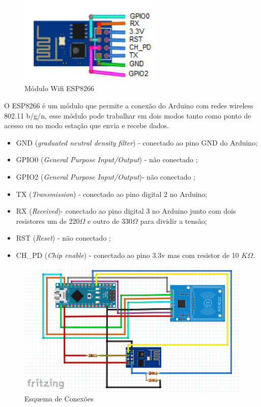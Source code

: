 
\begin{figure}[H]
              \caption{\label{fig:moduloWii}{Módulo Wifi ESP8266}}
              \centering
              \includegraphics[width=0.6\textwidth]{Figuras/Modulo_ESP8266.png}
\end{figure}

\par
O ESP8266 é um módulo que permite a conexão do Arduino com redes wireless 802.11 b/g/n, esse módulo pode
trabalhar em dois modos tanto como ponto de acesso ou no modo estação que envia e recebe dados.
\begin{itemize}
    \item GND (\textit{graduated neutral density filter}) - conectado ao pino GND do Arduino;
    \item GPIO0 (\textit{General Purpose Input/Output}) - não conectado ;
    \item GPIO2 (\textit{General Purpose Input/Output})- não conectado ;
    \item TX (\textit{Transmission}) - conectado ao pino digital 2 no Arduino;
    \item RX (\textit{Received})- conectado ao pino digital 3 no Arduino junto com dois resistores um de 220$\Omega$ e outro de 330$\Omega$ para dividir a tensão;
    \item RST (\textit{Reset}) - não conectado ;
    \item CH\_PD (\textit{Chip enable}) - conectado ao pino 3.3v mas com resistor de 10 $K\Omega$.
\end{itemize}


\begin{figure}[H]
              \caption{\label{fig:esq_conexoes}{Esquema de Conexões}}
              \centering
              \includegraphics[width=1\textwidth]{Figuras/esquema_de_conexoes2.PNG}
\end{figure}


